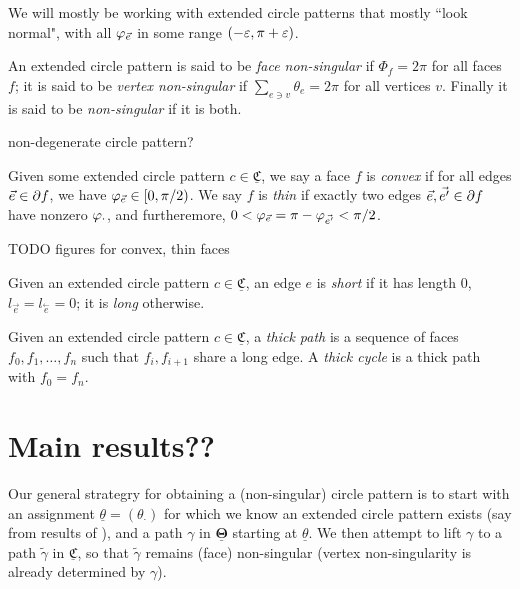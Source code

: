 \documentclass{amsart}
\newcommand{\CCC}{{\underline{\mathfrak{C}}}}
\newcommand{\TTT}{{\underline{\mathbf{\Theta}}}}
\newcommand{\cev}[1]{\overset{\leftarrow}{#1}}
\begin{document}
We will mostly be working with extended circle patterns that mostly ``look normal",
with all $\varphi_{\vec{e}}$ in some range $(-\varepsilon, \pi + \varepsilon)$.

\begin{definition}
An extended circle pattern is said to be \emph{face non-singular}
if $\Phi_f = 2\pi$ for all faces $f$; it is said to be \emph{vertex non-singular}
if $\sum_{e \ni v} \theta_e = 2\pi$ for all vertices $v$.
Finally it is said to be \emph{non-singular} if it is both.
\end{definition}

non-degenerate circle pattern?


\begin{definition}
Given some extended circle pattern $c \in \CCC$,
we say a face $f$ is \emph{convex} if for all edges $\vec{e} \in \partial f$,
we have $\varphi_{\vec{e}} \in [0,\pi/2)$.
We say $f$ is \emph{thin} if exactly two edges $\vec{e}, \vec{e'} \in \partial f$
have nonzero $\varphi_{\cdot}$, and furtheremore,
	$0 < \varphi_{\vec{e}} = \pi - \varphi_{\vec{e'}} < \pi/2$.
\end{definition}

TODO figures for convex, thin faces

\begin{definition}
Given an extended circle pattern $c\in \CCC$, an edge $e$ is \emph{short}
if it has length 0, $l_{\vec{e}} = l_{\cev{e}} = 0$;
it is \emph{long} otherwise.
\end{definition}


\begin{definition}
Given an extended circle pattern $c\in \CCC$, a \emph{thick path}
is a sequence of faces $f_0,f_1,\ldots,f_n$
such that $f_i,f_{i+1}$ share a long edge.
A \emph{thick cycle} is a thick path with $f_0 = f_n$.
\end{definition}




\section{Main results??}


Our general strategry for obtaining a (non-singular) circle pattern
is to start with an assignment $\underline{\theta} = (\theta_\cdot)$
for which we know an extended circle pattern exists
(say from results of ),
and a path $\gamma$ in $\TTT$ starting at $\underline{\theta}$.
We then attempt to lift $\gamma$ to a path $\tilde{\gamma}$ in $\CCC$,
so that $\tilde{\gamma}$ remains (face) non-singular
(vertex non-singularity is already determined by $\gamma$).
\end{document}
